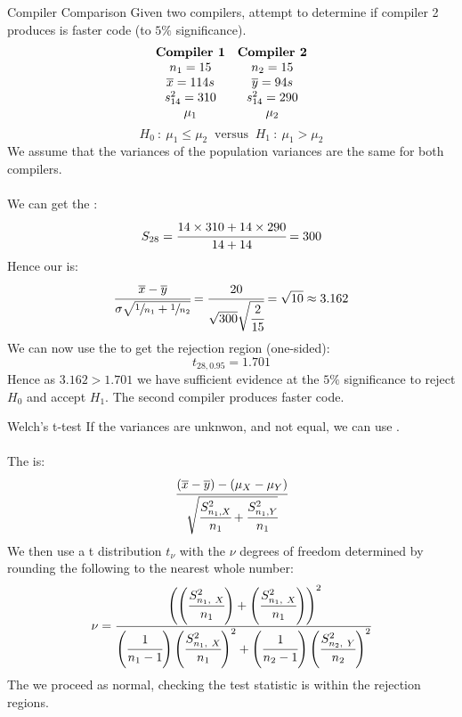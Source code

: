 \begin{examplebox}{Compiler Comparison}
	Given two compilers, attempt to determine if compiler 2 produces is faster code (to $5\%$ significance).
	\[\begin{matrix}
			\text{\textbf{Compiler 1}} & \text{\textbf{Compiler 2}} \\
			n_1 = 15                   & n_2 = 15                   \\
			\overline{x} = 114s        & \overline{y} = 94s         \\
			s_{14}^2 = 310             & s_{14}^2 = 290             \\
			\mu_1                      & \mu_2                      \\
		\end{matrix}\]
	\[H_0 \ : \ \mu_1 \leq \mu_2 \ \text{  versus  } \ H_1 \ : \ \mu_1 > \mu_2\]
	We assume that the variances of the population variances are the same for both compilers.
	\\
	\\ We can get the :
	\[S_{28} = \cfrac{14 \times 310 + 14 \times 290}{14 + 14} = 300\]
	Hence our  is:
	\[\cfrac{\overline{x} - \overline{y}}{\sigma \sqrt{\sfrac{1}{n_1} + \sfrac{1}{n_2}}} = \cfrac{20}{\sqrt{300}\sqrt{\cfrac{2}{15}}} = \sqrt{10} \approx 3.162\]
	We can now use the  to get the rejection region (one-sided):
	\[t_{28, 0.95} = 1.701\]
	Hence as $3.162 > 1.701$ we have sufficient evidence at the $5\%$ significance to reject $H_0$ and accept $H_1$. The second compiler produces faster code.
\end{examplebox}


\begin{sidenotebox}{Welch's t-test}
	If the variances are unknwon, and not equal, we can use .
	\\
	\\ The  is:
	\[\cfrac{(\overline{x} - \overline{y}) - (\mu_X - \mu_Y)}{\sqrt{\cfrac{S_{n_1, X}^2}{n_1} + \cfrac{S_{n_1, Y}^2}{n_1}}}\]
	We then use a t distribution $t_\nu$ with the $\nu$ degrees of freedom determined by rounding the following to the nearest whole number:
	\[\nu = \cfrac{\left(\left(\cfrac{S^2_{n_1, \ X}}{n_1}\right)+ \left(\cfrac{S^2_{n_1, \ X}}{n_1}\right) \right)^2}{\left(\cfrac{1}{n_1 - 1}\right)\left(\cfrac{S^2_{n_1, \ X}}{n_1}\right)^2 + \left(\cfrac{1}{n_2 - 1}\right)\left(\cfrac{S^2_{n_2, \ Y}}{n_2}\right)^2}\]
	The we proceed as normal, checking the test statistic is within the rejection regions.
\end{sidenotebox}
